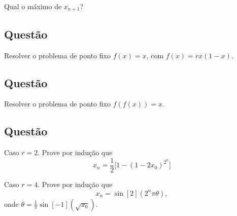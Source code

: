 \documentclass[a4paper,fleqn,12pt]{article}
\begin{document}
Qual o máximo de $x_{n+1}$?

\subsection{Questão}

Resolver o problema de ponto fixo $f(x) = x$, com $f(x) = rx(1-x)$.

\subsection{Questão}

Resolver o problema de ponto fixo $f(f(x)) = x$.


\subsection{Questão}

Caso $r = 2$. Prove por indução que
$$
x_n = \frac{1}{2} \Big[ 1 - (1-2x_0)^{2^n} \Big]
$$

Caso $r = 4$. Prove por indução que
$$
x_n = \sin[2](2^n \pi \theta),
$$
onde $\theta = \frac{1}{\pi} \sin[-1](\sqrt{x_0})$.
\end{document}
